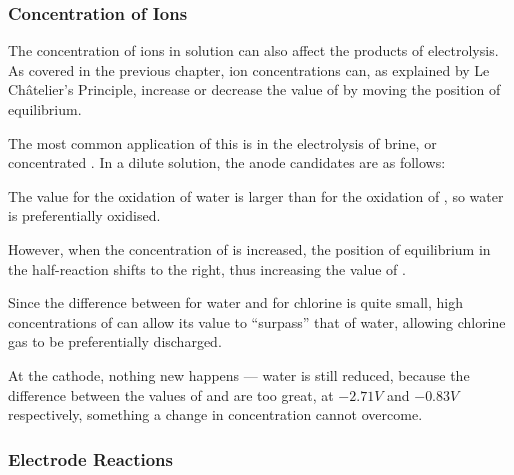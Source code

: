 

			\subsubsection{Concentration of Ions}

				The concentration of ions in solution can also affect the products of electrolysis. As covered in the previous chapter,
				ion concentrations can, as explained by Le Châtelier's Principle, increase or decrease the value of \Eo{} by moving
				the position of equilibrium.

				The most common application of this is in the electrolysis of brine, or concentrated . In a dilute solution,
				the anode candidates are as follows:


				The \Eox{} value for the oxidation of water is larger than for the oxidation of , so water is preferentially oxidised.

				However, when the concentration of \ch{\Cl-} is increased, the position of equilibrium in the half-reaction shifts to the
				right, thus increasing the value of \Eox{}.

				Since the difference between \Eox{} for water and for chlorine is quite small, high concentrations of \ch{\Cl-} can allow its
				\Eox{} value to ``surpass'' that of water, allowing chlorine gas to be preferentially discharged.

				At the cathode, nothing new happens --- water is still reduced, because the difference between the \Eo{} values of  and
				 are too great, at $-2.71V$ and $-0.83V$ respectively, something a change in concentration cannot overcome.




			\subsubsection{Electrode Reactions}

